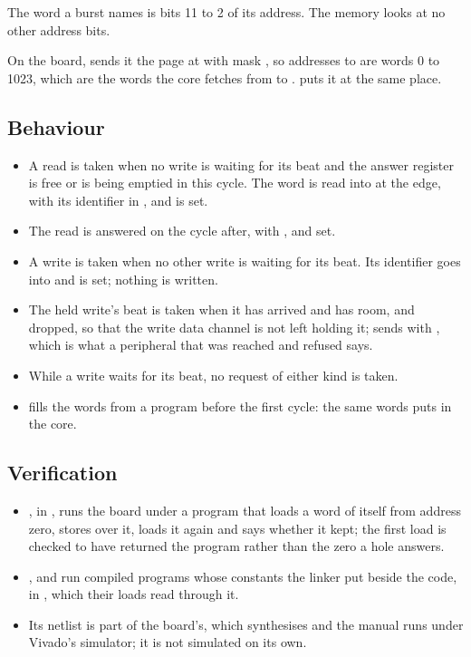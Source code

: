 The word a burst names is bits 11 to 2 of its address. The memory
looks at no other address bits.

On the board,  sends it the page at  with
mask , so addresses  to  are
words 0 to 1023, which are the words the core fetches from
 to .  puts it at the same place.


\subsection*{Behaviour}

\begin{itemize}
\item A read is taken when no write is waiting for its beat and the
answer register is free or is being emptied in this cycle. The word
is read into  at the edge, with its identifier in
, and  is set.
\item The read is answered on  the cycle after, with
,  and  set.
\item A write is taken when no other write is waiting for its beat.
Its identifier goes into  and  is set; nothing
is written.
\item The held write's beat is taken when it has arrived and
 has room, and dropped, so that the write data channel is
not left holding it;  sends  with ,
which is what a peripheral that was reached and refused says.
\item While a write waits for its beat, no request of either kind is
taken.
\item {} fills the words from a program before the
first cycle: the same words  puts in the core.
\end{itemize}

\subsection*{Verification}

\begin{itemize}
\item {}, in
, runs the board under a program
that loads a word of itself from address zero, stores over it, loads
it again and says whether it kept; the first load is checked to
have returned the program rather than the zero a hole answers.
\item {},
 and
 run compiled programs whose
constants the linker put beside the code, in , which
their loads read through it.
\item Its netlist is part of the board's, which
 synthesises and the manual
\allowbreak{} runs under Vivado's
simulator; it is not simulated on its own.
\end{itemize}

